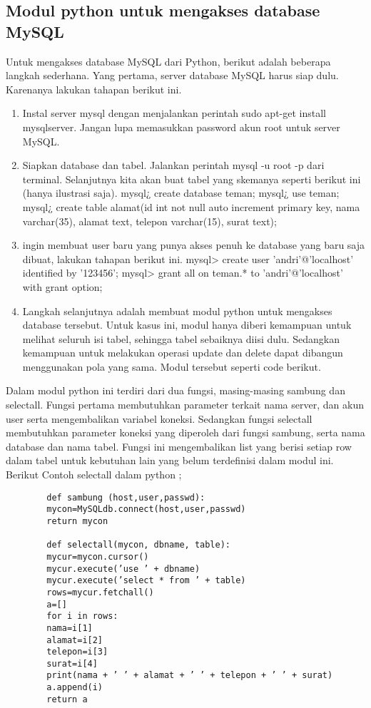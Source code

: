 \subsection {Modul python untuk mengakses database MySQL}
	Untuk mengakses database MySQL dari Python, berikut adalah beberapa langkah sederhana. Yang pertama, server database MySQL harus siap dulu. Karenanya lakukan tahapan berikut ini. 
	\begin{enumerate}
		\item Instal server mysql dengan menjalankan perintah sudo apt-get install mysqlserver. Jangan lupa memasukkan password akun root untuk server MySQL. 
		\item Siapkan database dan tabel. Jalankan perintah mysql -u root -p dari terminal. 
			Selanjutnya kita akan buat tabel yang skemanya seperti berikut ini (hanya ilustrasi saja). 
			mysql¿ create database teman; 
			mysql¿ use teman; 
			mysql¿ create table alamat(id int not null auto increment primary key, 
			nama varchar(35), alamat text, telepon varchar(15), surat text);

		\item  ingin membuat user baru yang punya akses penuh ke database yang baru saja dibuat, lakukan tahapan berikut ini. 
			mysql> create user 'andri'@'localhost' identified by '123456'; 	
			mysql> grant all on teman.* to 'andri'@'localhost' with grant option; 

		\item Langkah selanjutnya adalah membuat modul python untuk mengakses database tersebut. Untuk kasus ini, modul hanya diberi kemampuan untuk melihat seluruh isi tabel, sehingga tabel sebaiknya diisi dulu. Sedangkan kemampuan untuk melakukan operasi update dan delete dapat dibangun menggunakan pola yang sama. Modul tersebut seperti code berikut. 
	\end{enumerate}

Dalam modul python ini terdiri dari dua fungsi, masing-masing sambung dan selectall. Fungsi pertama membutuhkan parameter terkait nama server, dan akun user serta mengembalikan variabel koneksi. Sedangkan fungsi selectall membutuhkan parameter koneksi yang diperoleh dari fungsi sambung, serta nama database dan nama tabel. Fungsi ini mengembalikan list yang berisi setiap row dalam tabel untuk kebutuhan lain yang belum terdefinisi dalam modul ini. Berikut Contoh selectall dalam python ;

	\begin{verbatim}
		def sambung (host,user,passwd): 
		mycon=MySQLdb.connect(host,user,passwd) 
		return mycon
		
		def selectall(mycon, dbname, table): 
		mycur=mycon.cursor() 
		mycur.execute(’use ’ + dbname) 
		mycur.execute(’select * from ’ + table) 
		rows=mycur.fetchall() 
		a=[] 
		for i in rows: 
		nama=i[1] 
		alamat=i[2] 
		telepon=i[3] 
		surat=i[4] 
		print(nama + ’ ’ + alamat + ’ ’ + telepon + ’ ’ + surat) 
		a.append(i) 
		return a 
	\end{verbatim}

